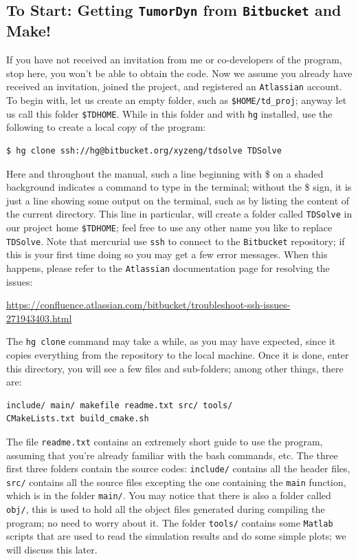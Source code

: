 \documentclass{amsproc}
\theoremstyle{definition}
\theoremstyle{remark}
\numberwithin{equation}{section}
\numberwithin{figure}{section}
\begin{document}
\subsection{To Start: Getting \texttt{TumorDyn} from \texttt{Bitbucket} and Make!}
If you have not received an invitation from me or co-developers of the program, stop here, you won't be able to obtain the code. 
Now we assume you already have received an invitation, joined the project, and registered an \texttt{Atlassian} account.
To begin with, let us create an empty folder, such as \texttt{\$HOME/td\_proj}; anyway let us call this folder \texttt{\$TDHOME}.
While in this folder and with \texttt{hg} installed, use the following to create a local copy of the program:
\begin{lstlisting}[backgroundcolor = \color{lightgray}, language = bash, xleftmargin = 0.1cm, framexleftmargin = 0.0cm]
$ hg clone ssh://hg@bitbucket.org/xyzeng/tdsolve TDSolve
\end{lstlisting}
Here and throughout the manual, such a line beginning with \$ on a shaded background indicates a command to type in the terminal; without the \$ sign, it is just a line showing some output on the terminal, such as by listing the content of the current directory.
This line in particular, will create a folder called \texttt{TDSolve} in our project home \texttt{\$TDHOME}; feel free to use any other name you like to replace \texttt{TDSolve}.
Note that mercurial use \texttt{ssh} to connect to the \texttt{Bitbucket} repository; if this is your first time doing so you may get a few error messages.
When this happens, please refer to the \texttt{Atlassian} documentation page for resolving the issues:
\begin{center}
{\color{blue} \url{https://confluence.atlassian.com/bitbucket/troubleshoot-ssh-issues-271943403.html}}
\end{center}
The \texttt{hg clone} command may take a while, as you may have expected, since it copies everything from the repository to the local machine.
Once it is done, enter this directory, you will see a few files and sub-folders; among other things, there are:
\begin{lstlisting}[backgroundcolor = \color{lightgray}, language = bash, xleftmargin = 0.1cm, framexleftmargin = 0.1cm]
include/ main/ makefile readme.txt src/ tools/
CMakeLists.txt build_cmake.sh
\end{lstlisting}
The file \texttt{readme.txt} contains an extremely short guide to use the program, assuming that you're already familiar with the bash commands, etc.
The three first three folders contain the source codes: \texttt{include/} contains all the header files, \texttt{src/} contains all the source files excepting the one containing the \texttt{main} function, which is in the folder \texttt{main/}.
You may notice that there is also a folder called \texttt{obj/}, this is used to hold all the object files generated during compiling the program; no need to worry about it.
The folder \texttt{tools/} contains some \texttt{Matlab} scripts that are used to read the simulation results and do some simple plots; we will discuss this later.
\end{document}
